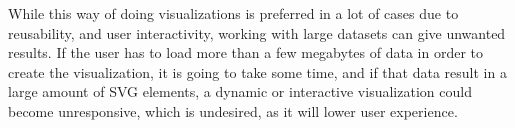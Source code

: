 \documentclass[Report.tex]{subfiles}
\begin{document}
	
	
	While this way of doing visualizations is preferred in a lot of cases due to reusability, and user interactivity, working with large datasets can give unwanted results. 
	If the user has to load more than a few megabytes of data in order to create the visualization, it is going to take some time, and if that data result in a large amount of SVG elements, a dynamic or interactive visualization could become unresponsive, which is undesired, as it will lower user experience.
\end{document}
